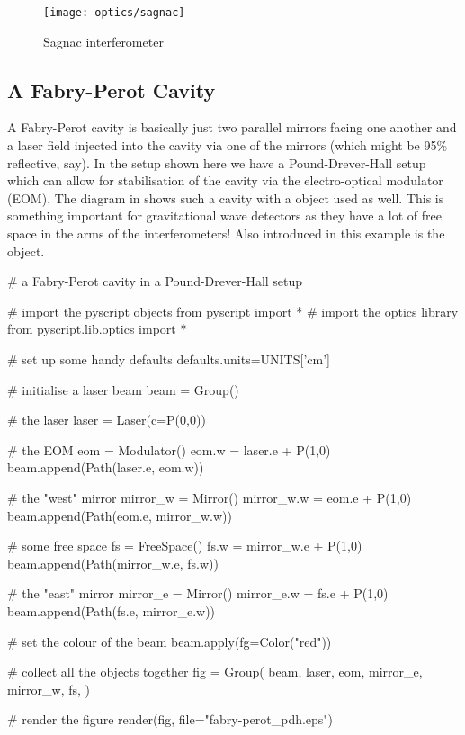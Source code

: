 \begin{figure}[ht]
\centerline{\texttt{[image: optics/sagnac]}}
\caption{Sagnac interferometer}
\label{fig:sagnac}
\end{figure}

\subsection{A Fabry-Perot Cavity}

A Fabry-Perot cavity is basically just two parallel mirrors facing one
another and a laser field injected into the cavity via one of the mirrors
(which might be 95\% reflective, say).  In the setup shown here we have a
Pound-Drever-Hall setup which can allow for stabilisation of the cavity via
the electro-optical modulator (EOM).  The diagram in
 shows such a cavity with a 
object used as well.  This is something important for gravitational wave
detectors as they have a lot of free space in the arms of the
interferometers!  Also introduced in this example is the 
object.

\begin{python}
# a Fabry-Perot cavity in a Pound-Drever-Hall setup

# import the pyscript objects
from pyscript import *
# import the optics library
from pyscript.lib.optics import *

# set up some handy defaults
defaults.units=UNITS['cm']

# initialise a laser beam
beam = Group()

# the laser
laser = Laser(c=P(0,0))

# the EOM
eom = Modulator()
eom.w = laser.e + P(1,0)
beam.append(Path(laser.e, eom.w))

# the "west" mirror
mirror_w = Mirror()
mirror_w.w = eom.e + P(1,0)
beam.append(Path(eom.e, mirror_w.w))

# some free space
fs = FreeSpace()
fs.w = mirror_w.e + P(1,0)
beam.append(Path(mirror_w.e, fs.w))

# the "east" mirror
mirror_e = Mirror()
mirror_e.w = fs.e + P(1,0)
beam.append(Path(fs.e, mirror_e.w))

# set the colour of the beam
beam.apply(fg=Color("red"))

# collect all the objects together
fig = Group(
        beam,
        laser,
        eom,
        mirror_e, mirror_w,
        fs,
        )

# render the figure
render(fig,
        file="fabry-perot_pdh.eps")
\end{python}

